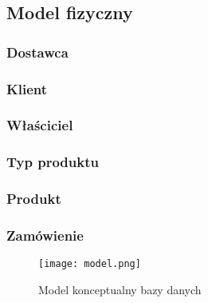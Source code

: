 \subsection{Model fizyczny}
\subsubsection{Dostawca}

\subsubsection{Klient}

\subsubsection{Właściciel}

\subsubsection{Typ produktu}

\subsubsection{Produkt}

\subsubsection{Zamówienie}

\begin{figure}
  \texttt{[image: model.png]}
  \caption{Model konceptualny bazy danych}
  \label{konc}
\end{figure}

